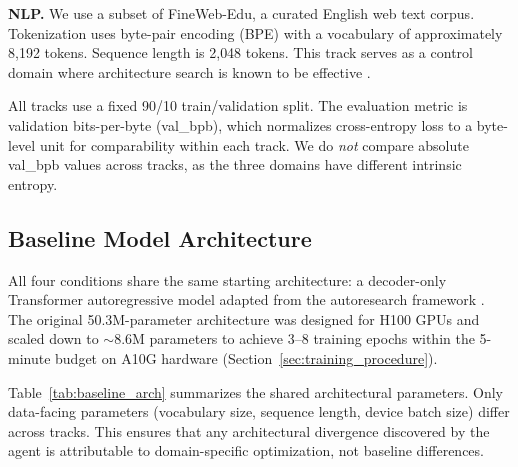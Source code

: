 \textbf{NLP.}
We use a subset of FineWeb-Edu, a curated English web text corpus. Tokenization uses byte-pair encoding (BPE) with a vocabulary of approximately 8{,}192 tokens. Sequence length is 2{,}048 tokens. This track serves as a control domain where architecture search is known to be effective \citep{karpathy2026autoresearch}.

All tracks use a fixed 90/10 train/validation split. The evaluation metric is validation bits-per-byte (val\_bpb), which normalizes cross-entropy loss to a byte-level unit for comparability within each track. We do \emph{not} compare absolute val\_bpb values across tracks, as the three domains have different intrinsic entropy.

\subsection{Baseline Model Architecture}
\label{sec:baseline_arch}

All four conditions share the same starting architecture: a decoder-only Transformer \citep{vaswani2017attention} autoregressive model adapted from the autoresearch framework \citep{karpathy2026autoresearch}. The original 50.3M-parameter architecture was designed for H100 GPUs and scaled down to ${\sim}$8.6M parameters to achieve 3--8 training epochs within the 5-minute budget on A10G hardware (Section~\ref{sec:training_procedure}).

Table~\ref{tab:baseline_arch} summarizes the shared architectural parameters. Only data-facing parameters (vocabulary size, sequence length, device batch size) differ across tracks. This ensures that any architectural divergence discovered by the agent is attributable to domain-specific optimization, not baseline differences.

